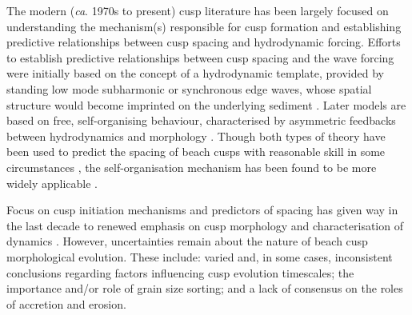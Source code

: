 The modern (\textit{ca}. 1970s to present) cusp literature has been largely focused on understanding the mechanism(s) responsible for cusp formation and establishing predictive relationships between cusp spacing and hydrodynamic forcing. Efforts to establish predictive relationships between cusp spacing and the wave forcing were initially based on the concept of a hydrodynamic template, provided by standing low mode subharmonic or synchronous edge waves, whose spatial structure would become imprinted on the underlying sediment \citep{Guza_Inman1975, Guza_Bowen1981, Holman_Bowen1982}. Later models are based on free, self-organising behaviour, characterised by asymmetric feedbacks between hydrodynamics and morphology \citep{Werner_Fink1993, Coco_etal2000, Coco_etal2004, Sunamura2004, Dodd_etal2008}. Though both types of theory have been used to predict the spacing of beach cusps with reasonable skill in some circumstances \citep{Coco_etal1999}, the self-organisation mechanism has been found to be more widely applicable \citep{Coco_Murray2007}. 

Focus on cusp initiation mechanisms and predictors of spacing has given way in the last decade to renewed emphasis on cusp morphology and characterisation of dynamics \citep[e.g.,][]{Almar_etal2008, VanGaalen_etal2011, Vousdoukas2012, Poate_etal2014}. However, uncertainties remain about the nature of beach cusp morphological evolution. These include: varied and, in some cases, inconsistent conclusions regarding factors influencing cusp evolution timescales; the importance and/or role of grain size sorting; and a lack of consensus on the roles of accretion and erosion. 

